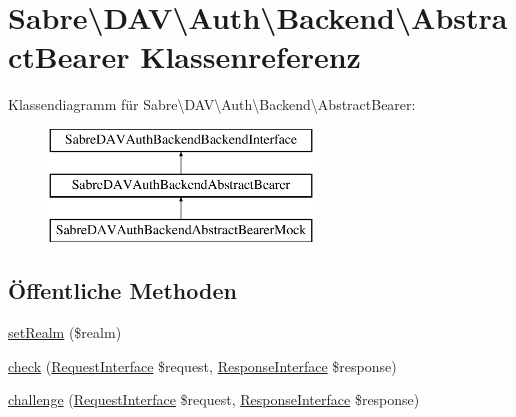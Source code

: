 \hypertarget{class_sabre_1_1_d_a_v_1_1_auth_1_1_backend_1_1_abstract_bearer}{}\section{Sabre\textbackslash{}D\+AV\textbackslash{}Auth\textbackslash{}Backend\textbackslash{}Abstract\+Bearer Klassenreferenz}
\label{class_sabre_1_1_d_a_v_1_1_auth_1_1_backend_1_1_abstract_bearer}
Klassendiagramm für Sabre\textbackslash{}D\+AV\textbackslash{}Auth\textbackslash{}Backend\textbackslash{}Abstract\+Bearer\+:\begin{figure}[H]
\begin{center}
\leavevmode
\includegraphics[height=3.000000cm]{class_sabre_1_1_d_a_v_1_1_auth_1_1_backend_1_1_abstract_bearer}
\end{center}
\end{figure}
\subsection*{Öffentliche Methoden}
\begin{DoxyCompactItemize}
\item 
\mbox{\hyperlink{class_sabre_1_1_d_a_v_1_1_auth_1_1_backend_1_1_abstract_bearer_a3919c15a2c08de4ecd42fd1741e6dc7a}{set\+Realm}} (\$realm)
\item 
\mbox{\hyperlink{class_sabre_1_1_d_a_v_1_1_auth_1_1_backend_1_1_abstract_bearer_ac43079a9c47779745f3435cb775da867}{check}} (\mbox{\hyperlink{interface_sabre_1_1_h_t_t_p_1_1_request_interface}{Request\+Interface}} \$request, \mbox{\hyperlink{interface_sabre_1_1_h_t_t_p_1_1_response_interface}{Response\+Interface}} \$response)
\item 
\mbox{\hyperlink{class_sabre_1_1_d_a_v_1_1_auth_1_1_backend_1_1_abstract_bearer_afc3437d1b84fbf2f460331312cec07aa}{challenge}} (\mbox{\hyperlink{interface_sabre_1_1_h_t_t_p_1_1_request_interface}{Request\+Interface}} \$request, \mbox{\hyperlink{interface_sabre_1_1_h_t_t_p_1_1_response_interface}{Response\+Interface}} \$response)
\end{DoxyCompactItemize}
